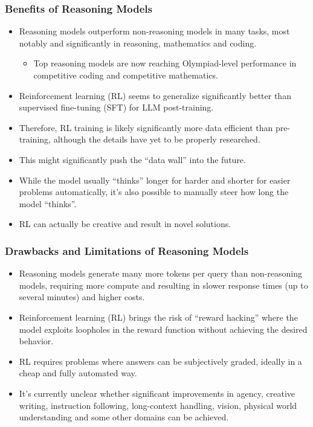 \documentclass[aspectratio=169]{beamer}
\begin{document}
    \begin{frame}
        \frametitle{Benefits of Reasoning Models}
        \begin{itemize}
            \item Reasoning models outperform non-reasoning models in many tasks, most notably and significantly in reasoning, mathematics and coding.
            \begin{itemize}
                \item Top reasoning models are now reaching Olympiad-level performance in competitive coding and competitive mathematics.
            \end{itemize}
            \item Reinforcement learning (RL) seems to generalize significantly better than supervised fine-tuning (SFT) for LLM post-training.~\parencite{chu2025sftmemorizesrlgeneralizes}
            \item Therefore, RL training is likely significantly more data efficient than pre-training, although the details have yet to be properly researched.
            \item This might significantly push the ``data wall'' into the future.
            \item While the model usually ``thinks'' longer for harder and shorter for easier problems automatically, it's also possible to manually steer how long the model ``thinks''.
            \item RL can actually be creative and result in novel solutions.
        \end{itemize}
    \end{frame}
    \begin{frame}
        \frametitle{Drawbacks and Limitations of Reasoning Models}
        \begin{itemize}
            \item Reasoning models generate many more tokens per query than non-reasoning models, requiring \alert{more compute} and resulting in slower response times (up to several minutes) and higher costs.
            \item Reinforcement learning (RL) brings the risk of ``reward hacking'' where the model exploits loopholes in the reward function without achieving the desired behavior.
            \item RL requires problems where answers can be subjectively graded, ideally in a cheap and fully automated way.
            \item It's currently unclear whether significant improvements in agency, creative writing, instruction following, long-context handling, vision, physical world understanding and some other domains can be achieved.
        \end{itemize}
    \end{frame}
\end{document}
